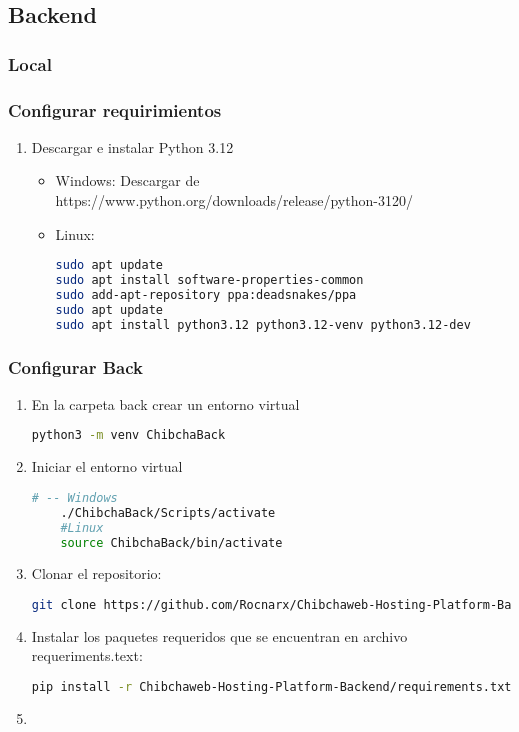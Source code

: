 \subsection{Backend}
\subsubsection{Local}
\subsubsection*{Configurar requirimientos}
\begin{enumerate}
	\item Descargar e instalar Python 3.12
	\begin{itemize}
	\item Windows:
	Descargar de https://www.python.org/downloads/release/python-3120/
	\item Linux:
	    \begin{lstlisting}[language=bash]
sudo apt update
sudo apt install software-properties-common
sudo add-apt-repository ppa:deadsnakes/ppa
sudo apt update
sudo apt install python3.12 python3.12-venv python3.12-dev
        \end{lstlisting}
	\end{itemize}
\end{enumerate}

\subsubsection*{Configurar Back}
\begin{enumerate}
    \item En la carpeta back crear un entorno virtual
        \begin{lstlisting}[language=bash]
    python3 -m venv ChibchaBack
       \end{lstlisting}
    \item Iniciar el entorno virtual

    \begin{lstlisting}[language=bash]
    # -- Windows
    ./ChibchaBack/Scripts/activate
    #Linux
    source ChibchaBack/bin/activate
    \end{lstlisting}

	\item Clonar el repositorio:
	\begin{lstlisting}[language=bash]
    git clone https://github.com/Rocnarx/Chibchaweb-Hosting-Platform-Backend.git
    \end{lstlisting}

    \item Instalar los paquetes requeridos que se encuentran en archivo requeriments.text:
    \begin{lstlisting}[language=bash]
    pip install -r Chibchaweb-Hosting-Platform-Backend/requirements.txt
    \end{lstlisting}


     \item

\end{enumerate}
